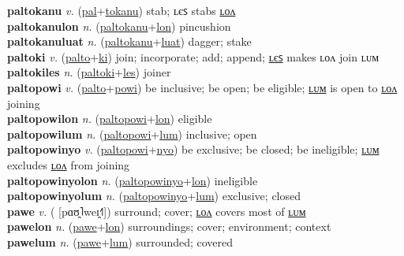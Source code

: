 \textbf{paltokanu} \textit{v.} (\hyperref[pal]{pal}+\hyperref[tokanu]{tokanu})
stab; ʟєꜱ stabs \hyperref[paltokanulon]{ʟᴏᴧ} \label{paltokanu} \\
\textbf{paltokanulon} \textit{n.} (\hyperref[paltokanu]{paltokanu}+\hyperref[lon]{lon})
pincushion \label{paltokanulon} \\
\textbf{paltokanuluat} \textit{n.} (\hyperref[paltokanu]{paltokanu}+\hyperref[luat]{luat})
dagger; stake \label{paltokanuluat} \\
\textbf{paltoki} \textit{v.} (\hyperref[palto]{palto}+\hyperref[ki]{ki})
join; incorporate; add; append; \hyperref[paltokiles]{ʟєꜱ} makes ʟᴏᴧ join ʟᴜᴍ \label{paltoki} \\
\textbf{paltokiles} \textit{n.} (\hyperref[paltoki]{paltoki}+\hyperref[les]{les})
joiner \label{paltokiles} \\
\textbf{paltopowi} \textit{v.} (\hyperref[palto]{palto}+\hyperref[powi]{powi})
be inclusive; be open; be eligible; \hyperref[paltopowilum]{ʟᴜᴍ} is open to \hyperref[paltopowilon]{ʟᴏᴧ} joining \label{paltopowi} \\
\textbf{paltopowilon} \textit{n.} (\hyperref[paltopowi]{paltopowi}+\hyperref[lon]{lon})
eligible \label{paltopowilon} \\
\textbf{paltopowilum} \textit{n.} (\hyperref[paltopowi]{paltopowi}+\hyperref[lum]{lum})
inclusive; open \label{paltopowilum} \\
\textbf{paltopowinyo} \textit{v.} (\hyperref[paltopowi]{paltopowi}+\hyperref[nyo]{nyo})
be exclusive; be closed; be ineligible; \hyperref[paltopowinyolum]{ʟᴜᴍ} excludes \hyperref[paltopowinyolon]{ʟᴏᴧ} from joining \label{paltopowinyo} \\
\textbf{paltopowinyolon} \textit{n.} (\hyperref[paltopowinyo]{paltopowinyo}+\hyperref[lon]{lon})
ineligible \label{paltopowinyolon} \\
\textbf{paltopowinyolum} \textit{n.} (\hyperref[paltopowinyo]{paltopowinyo}+\hyperref[lum]{lum})
exclusive; closed \label{paltopowinyolum} \\
\textbf{pawe} \textit{v.} ( [pɑʊ̯˥weɪ̯˧˥])
surround; cover; \hyperref[pawelon]{ʟᴏᴧ} covers most of \hyperref[pawelum]{ʟᴜᴍ} \label{pawe} \\
\textbf{pawelon} \textit{n.} (\hyperref[pawe]{pawe}+\hyperref[lon]{lon})
surroundings; cover; environment; context \label{pawelon} \\
\textbf{pawelum} \textit{n.} (\hyperref[pawe]{pawe}+\hyperref[lum]{lum})
surrounded; covered \label{pawelum} \\
